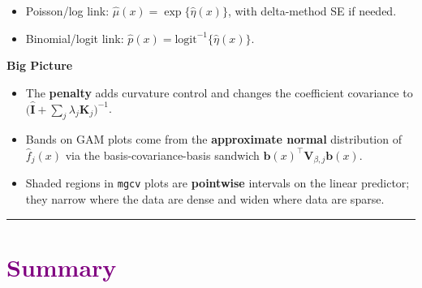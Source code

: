 \documentclass[
  letterpaper,
  DIV=11,
  numbers=noendperiod]{scrreprt}
\providecommand{\tightlist}{%
  \setlength{\itemsep}{0pt}\setlength{\parskip}{0pt}}\usepackage{longtable,booktabs,array}
\begin{document}
\begin{itemize}
\tightlist
\item
  Poisson/log link: \(\hat{\mu}(x)=\exp\{\hat{\eta}(x)\}\), with
  delta-method SE if needed.
\item
  Binomial/logit link:
  \(\hat{p}(x)=\mathrm{logit}^{-1}\{\hat{\eta}(x)\}\).
\end{itemize}

\textbf{Big Picture}

\begin{itemize}
\tightlist
\item
  The \textbf{penalty} adds curvature control and changes the
  coefficient covariance to
  \(\big(\hat{\mathbf{I}} + \sum_j \lambda_j \mathbf{K}_j\big)^{-1}\).
\item
  Bands on GAM plots come from the \textbf{approximate normal}
  distribution of \(\hat{f}_j(x)\) via the basis-covariance-basis
  sandwich \(\mathbf{b}(x)^\top \mathbf{V}_{\beta,j}\mathbf{b}(x)\).
\item
  Shaded regions in \texttt{mgcv} plots are \textbf{pointwise} intervals
  on the linear predictor; they narrow where the data are dense and
  widen where data are sparse.
\end{itemize}

\begin{center}\rule{0.5\linewidth}{0.5pt}\end{center}

\hypertarget{section-30}{%
\section*{\texorpdfstring{\textcolor{purple}{Summary}}{}}\label{section-30}}

\markright{\textcolor{purple}{Summary}}
\end{document}

